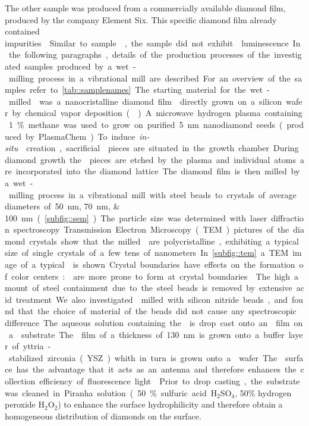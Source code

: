 	The other sample was produced from a commercially available diamond film, produced by the company Element Six.
	This specific diamond film already contained \si impurities.
	Similar to sample \basds, the sample did not exhibit \siv luminescence.
	In the following paragraphs, details of the production processes of the investigated samples produced by a wet-milling process in a vibrational mill are described. 
	For an overview of the samples refer to \autoref{tab::samplenames}.
	The starting material for the wet-milled \nds was a nanocristalline diamond film \cite{Williams2006a} directly grown on a silicon wafer by chemical vapor deposition (\CVD). 
	A microwave hydrogen plasma containing 1\% methane was used to grow on purified \SI{5}{\nano\meter} nanodiamond seeds (produced by PlasmaChem).
	To induce \textit{in-situ} \siv creation, sacrificial \Si pieces are situated in the growth chamber.
	During diamond growth the \Si pieces are etched by the plasma and individual atoms are incorporated into the diamond lattice.
	The diamond film is then milled by a wet-milling process in a vibrational mill with steel beads to crystals of average diameters of \SIlist{50; 70; 100}{\nano\meter} (\autoref{subfig::sem}).
	The particle size was determined with laser diffraction spectroscopy.
	Transmission Electron Microscopy (TEM) pictures of the diamond crystals show that the milled \nds are polycristalline, exhibiting a typical size of single crystals of a few tens of nanometers.
	In \autoref{subfig::tem} a TEM image of a typical \nd is shown.
	Crystal boundaries have effects on the formation of color centers:
	\sivs are more prone to form at crystal boundaries \cite{Zapol2001}.
	The high amount of steel containment due to the steel beads is removed by extensive acid treatment.
	We also investigated \nds milled with silicon nitride beads, and found that the choice of material of the beads did not cause any spectroscopic difference.
	The aqueous solution containing the \nds is drop cast onto an \ir film on a \Si substrate.
	The \ir film of a thickness of \SI{130}{nm} is grown onto a buffer layer of yttria-stabilized zirconia (YSZ) whith in turn is grown onto a \Si wafer.
	The \ir surface has the advantage that it acts as an antenna and therefore enhances the collection efficiency of fluorescence light \cite{Neu2012a}.
	Prior to drop casting, the substrate was cleaned in Piranha solution (50\% sulfuric acid H$_2$SO$_4$, 50\% hydrogen peroxide H$_2$O$_2$) to enhance the surface hydrophilicity and therefore obtain a homogeneous distribution of diamonds on the surface.
